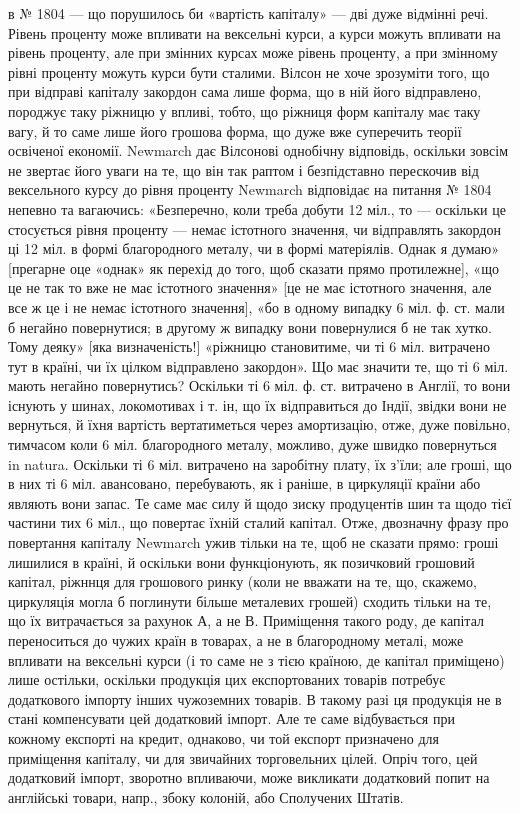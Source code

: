 \parcont{}  %
в № 1804 — що порушилось би «вартість капіталу» — дві дуже відмінні речі.
Рівень проценту може впливати на вексельні курси, а курси можуть впливати
на рівень проценту, але при змінних курсах може рівень проценту, а при змінному
рівні проценту можуть курси бути сталими. Вілсон не хоче зрозуміти того,
що при відправі капіталу закордон сама лише форма, що в ній його відправлено,
породжує таку ріжницю у впливі, тобто, що ріжниця форм капіталу має таку
вагу, й то саме лише його грошова форма, що дуже вже суперечить теорії
освіченої економії. Newmarch дає Вілсонові однобічну відповідь, оскільки зовсім
не звертає його уваги на те, що він так раптом і безпідставно перескочив від вексельного
курсу до рівня проценту Newmarch відповідає на питання № 1804
непевно та вагаючись: «Безперечно, коли треба добути 12 міл., то — оскільки
це стосується рівня проценту — немає істотного значення, чи відправлять
закордон ці 12 міл. в формі благородного металу, чи в формі матеріялів.
Однак я думаю» [прегарне оце «однак» як перехід до того, щоб сказати прямо
протилежне], «що це не так то вже не має істотного значення» [це не має істотного
значення, але все ж це і не немає істотного значення], «бо в одному
випадку 6 міл. ф. ст. мали б негайно повернутися; в другому ж випадку вони
повернулися б не так хутко. Тому деяку» [яка визначеність!] «ріжницю становитиме,
чи ті 6 міл. витрачено тут в країні, чи їх цілком відправлено закордон».
Що має значити те, що ті 6 міл. мають негайно повернутись? Оскільки
ті 6 міл. ф. ст. витрачено в Англії, то вони існують у шинах, локомотивах і т. ін,
що їх відправиться до Індії, звідки вони не вернуться, й їхня вартість вертатиметься
через амортизацію, отже, дуже повільно, тимчасом коли 6 міл. благородного
металу, можливо, дуже швидко повернуться in natura. Оскільки ті 6 міл.
витрачено на заробітну плату, їх з’їли; але гроші, що в них ті 6 міл. авансовано,
перебувають, як і раніше, в циркуляції країни або являють вони запас.
Те саме має силу й щодо зиску продуцентів шин та щодо тієї частини тих 6 міл.,
що повертає їхній сталий капітал. Отже, двозначну фразу про повертання
капіталу Newmarch ужив тільки на те, щоб не сказати прямо: гроші лишилися
в країні, й оскільки вони функціонують, як позичковий грошовий капітал, ріжннця
для грошового ринку (коли не вважати на те, що, скажемо, циркуляція
могла б поглинути більше металевих грошей) сходить тільки на те, що їх витрачається
за рахунок $А$, а не $В$. Приміщення такого роду, де капітал переноситься
до чужих країн в товарах, а не в благородному металі, може впливати на вексельні
курси (і то саме не з тією країною, де капітал приміщено) лише остільки,
оскільки продукція цих експортованих товарів потребує додаткового імпорту
інших чужоземних товарів. В такому разі ця продукція не в стані компенсувати
цей додатковий імпорт. Але те саме відбувається при кожному експорті на кредит,
однаково, чи той експорт призначено для приміщення капіталу, чи для
звичайних торговельних цілей. Опріч того, цей додатковий імпорт, зворотно
впливаючи, може викликати додатковий попит на англійські товари, напр.,
збоку колоній, або Сполучених Штатів.

